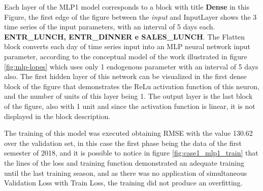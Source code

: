         
        Each layer of the MLP1 model corresponds to a block with title  \textbf{Dense}  in this Figure, the first edge of the figure between the \textit{input} and InputLayer shows the 3 time series of the input parameters, with an interval of 5 days each. \textbf{ENTR\_LUNCH, ENTR\_DINNER e SALES\_LUNCH}. The Flatten block converts each day of time series input into an MLP neural network input parameter, according to the conceptual model of the work illustrated in figure  \ref{fig:mlp-lopes} which uses only 1 endogenous parameter with an interval of 5 days also. The first hidden layer of this network can be visualized in the first dense block of the figure that demonstrates the ReLu activation function of this neuron, and the number of units of this layer being 1.
        The output layer is the last block of the figure, also with 1 unit and since the activation function is linear, it is not displayed in the block description.

        
        The training of this model was executed obtaining RMSE with the value 130.62 over the validation set, in this case the first phase being the data of the first semester of 2018, and it is possible to notice in figure \ref{fig:case1_mlp1_train} that the lines of the loss and training function demonstrated an adequate training until the last training season, and as there was no application of simultaneous Validation Loss with Train Loss, the training did not produce an overfitting.
        \begin{figure}[H]
        \end{figure}
        
